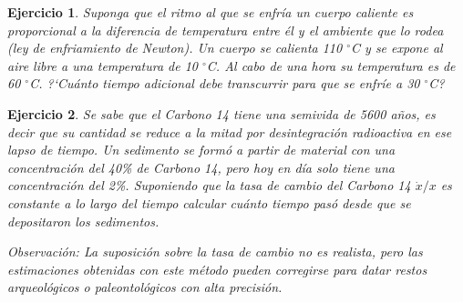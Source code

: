 \documentclass[11pt,a4paper,pdftex]{amsart}
\newtheorem{ej}{Ejercicio}%
\numberwithin{equation}{section}%
\newcommand{\bej}[1]{\begin{ej}\rm{#1}}
\newcommand{\eej}{\end{ej}\vspace{-0.2cm}}
\newcommand{\R}{\mathbb R}
\newcommand{\0}{\mathbb O}
\newcommand{\8}{\infty}
\begin{document}

\bej Suponga que el ritmo al que se enfría un cuerpo caliente
es proporcional a la diferencia de temperatura entre \'el y el
ambiente que lo rodea (ley de enfriamiento de Newton). Un cuerpo
se calienta 110 $^{\circ}$C y se expone al aire libre a una
temperatura de 10 $\mbox{}^{\circ }$C. Al cabo de una hora su
temperatura es de 60 $^{\circ}$C. ?`Cu\'anto tiempo adicional
debe transcurrir para que se enfríe a 30 $^{\circ}$C?
\eej
\bigskip

\bej Se sabe que el Carbono 14 tiene una semivida de 5600 años, es decir que 
su cantidad se reduce a la mitad por desintegración radioactiva en ese lapso 
de tiempo. Un sedimento se formó a partir de material con una concentración 
del 40\% de Carbono 14, pero hoy en día solo tiene una concentración del 2\%. 
Suponiendo que la tasa de cambio del Carbono 14 $\dot x/x$ es constante a lo 
largo del tiempo calcular cuánto tiempo pasó desde que se depositaron los 
sedimentos.

Observación: La suposición sobre la tasa de cambio no es realista, pero las 
estimaciones obtenidas con este método pueden corregirse para datar restos 
arqueológicos o paleontológicos con alta precisión.
\eej




\end{document}
